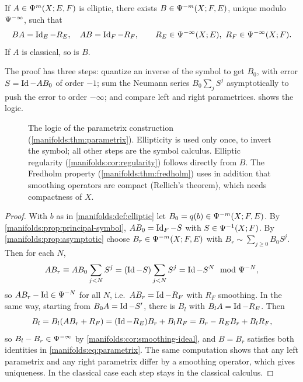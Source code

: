 \begin{theorem}\label{manifolds:thm:parametrix}
If $A\in\Psi^{m}(X;E,F)$ is elliptic, there exists $B\in\Psi^{-m}(X;F,E)$, unique
modulo $\Psi^{-\infty}$, such that
\begin{equation}\label{manifolds:eq:parametrix}
BA=\Id_E-R_E,\quad AB=\Id_F-R_F,\qquad R_E\in\Psido{-\infty}(X;E),\ R_F\in\Psido{-\infty}(X;F).
\end{equation}
If $A$ is classical, so is $B$.
\end{theorem}

The proof has three steps: quantize an inverse of the symbol to get $B_0$,
with error $S=\operatorname{Id}-AB_0$ of order $-1$; sum the Neumann series
$B_0\sum_jS^j$ asymptotically to push the error to order $-\infty$; and
compare left and right parametrices.  shows
the logic.

\begin{figure}[ht]
\centering
{}
\caption{The logic of the parametrix construction
(\cref{manifolds:thm:parametrix}). Ellipticity is used only once, to invert
the symbol; all other steps are the symbol calculus. Elliptic regularity
(\cref{manifolds:cor:regularity}) follows directly from $B$. The Fredholm
property (\cref{manifolds:thm:fredholm}) uses in addition that smoothing
operators are compact (Rellich's theorem), which needs compactness of $X$.}
\label{manifolds:fig:parametrix}
\end{figure}

\begin{proof}
With $b$ as in \cref{manifolds:def:elliptic} let $B_0=q(b)\in\Psi^{-m}(X;F,E)$.
By \cref{manifolds:prop:principal-symbol},
$AB_0=\operatorname{Id}_F-S$ with $S\in\Psi^{-1}(X;F)$. By
\cref{manifolds:prop:asymptotic} choose $B_r\in\Psi^{-m}(X;F,E)$ with
$B_r\sim\sum_{j\ge0}B_0S^j$. Then for each $N$,
\begin{equation*}
AB_r\equiv AB_0\sum_{j<N}S^j=(\Id-S)\sum_{j<N}S^j=\Id-S^N\mod\Psido{-N},
\end{equation*}
so $AB_r-\operatorname{Id}\in\Psi^{-N}$ for all $N$, i.e.\ $AB_r=\operatorname{Id}-R_F$ with $R_F$ smoothing. In
the same way, starting from $B_0A=\operatorname{Id}-S'$, there is $B_l$ with $B_lA=\operatorname{Id}-R_E$. Then
\begin{equation*}
B_l=B_l(AB_r+R_F)=(\operatorname{Id}-R_E)B_r+B_lR_F=B_r-R_EB_r+B_lR_F,
\end{equation*}
so $B_l-B_r\in\Psi^{-\infty}$ by \cref{manifolds:cor:smoothing-ideal}, and
$B=B_r$ satisfies both identities in \eqref{manifolds:eq:parametrix}. The same
computation shows that any left parametrix and any right parametrix differ by a
smoothing operator, which gives uniqueness. In the classical case each step stays
in the classical calculus.
\end{proof}

